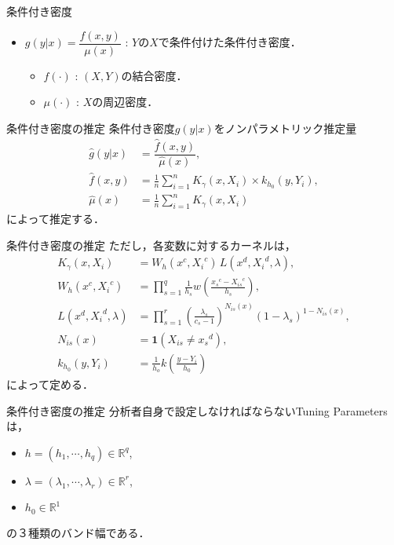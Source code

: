 \documentclass[xcolor=svgnames,dvipdfmx,cjk]{beamer}
\theoremstyle{example}
\begin{document}
\begin{frame}{条件付き密度}
  \begin{itemize}
  \item $g(y|x) = \dfrac{f(x,y)}{\mu(x)}$ 
    : $Y$の$X$で条件付けた条件付き密度．
    \begin{itemize}
      \item $f(\cdot)$ : $(X,Y)$の結合密度．
      \item $\mu(\cdot)$ : $X$の周辺密度．
    \end{itemize}
  \end{itemize}
\end{frame}


\begin{frame}{条件付き密度の推定}
\quad 
条件付き密度$g(y|x)$をノンパラメトリック推定量
  \begin{align*}
  \hat{g}(y|x) 
    &=\dfrac{\hat{f}(x,y)}{\hat{\mu}(x)}, \\
  \hat{f}(x,y) 
    &=\displaystyle\frac{1}{n} \sum_{i=1}^n K_{\gamma}(x,X_i) \times k_{h_0}(y,Y_i), \\
  \hat{\mu}(x) 
    &= \displaystyle\frac{1}{n} \sum_{i=1}^n K_{\gamma}(x,X_i)
  \end{align*}
によって推定する．
\end{frame}


\begin{frame}{条件付き密度の推定}
\quad 
ただし，各変数に対するカーネルは，
  \begin{align*}
    K_{\gamma}(x,X_i) 
      &= W_h(x^c,{X_i}^c) \, L(x^d, {X_i}^d, \lambda), \\
    W_h(x^c,{X_i}^c) 
      &= \displaystyle \prod_{s=1}^{q} 
         \frac{1}{h_s} w\left( \frac{{x_s}^c-{X_{is}}^c} {h_s}\right), \\
    L(x^d, {X_i}^d, \lambda) 
      &= \displaystyle \prod_{s=1}^r 
         \left(\frac{\lambda_s}{c_s-1}\right)^{N_{is}(x)}
         (1-\lambda_s)^{1-N_{is}(x)},\\
    N_{is}(x) 
      &= \mathbf{1}(X_{is} \neq {x_s}^d), \\
    k_{h_0}(y,Y_i) 
      &= \displaystyle \frac{1}{h_o} k \left( \frac{y-Y_i}{h_0}\right)
  \end{align*}
によって定める．  
\end{frame}


\begin{frame}{条件付き密度の推定}
\quad 
分析者自身で設定しなければならないTuning Parametersは，
  \begin{itemize}
    \item $h = (h_1,\cdots,h_q) \in \mathbb{R}^q$, 
    \item $\lambda = (\lambda_1,\cdots,\lambda_r) \in \mathbb{R}^r$,
    \item $h_0 \in \mathbb{R}^1$
  \end{itemize}
の３種類のバンド幅である．
\end{frame}
\end{document}
